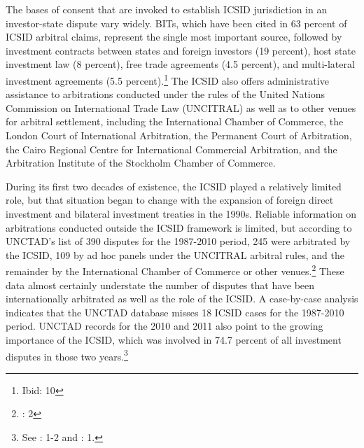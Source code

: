 \documentclass[12pt,onesided]{amsart}
\begin{document}
The bases of consent that are invoked to establish ICSID jurisdiction in an investor-state dispute vary widely. BITs, which have been cited in 63 percent of ICSID arbitral claims, represent the single most important source, followed by investment contracts between states and foreign investors (19 percent), host state investment law (8 percent), free trade agreements (4.5 percent), and multi-lateral investment agreements (5.5 percent).\footnote{Ibid: 10} The ICSID also offers administrative assistance to arbitrations conducted under the rules of the United Nations Commission on International Trade Law (UNCITRAL) as well as to other venues for arbitral settlement, including the International Chamber of Commerce, the London Court of International Arbitration, the Permanent Court of Arbitration, the Cairo Regional Centre for International Commercial Arbitration, and the Arbitration Institute of the Stockholm Chamber of Commerce.

During its first two decades of existence, the ICSID played a relatively limited role, but that situation began to change with the expansion of foreign direct investment and bilateral investment treaties in the 1990s. Reliable information on arbitrations conducted outside the ICSID framework is limited, but according to UNCTAD's list of 390 disputes for the 1987-2010 period, 245 were arbitrated by the ICSID, 109 by ad hoc panels under the UNCITRAL arbitral rules, and the remainder by the International Chamber of Commerce or other venues.\footnote{\citet{unctad:2011}: 2} These data almost certainly understate the number of disputes that have been internationally arbitrated as well as the role of the ICSID. A case-by-case analysis indicates that the UNCTAD database misses 18 ICSID cases for the 1987-2010 period. UNCTAD records for the 2010 and 2011 also point to the growing importance of the ICSID, which was involved in 74.7 percent of all investment disputes in those two years.\footnote{See \citet{unctad:2011}: 1-2 and \citet{unctad:2012}: 1.}
\end{document}
